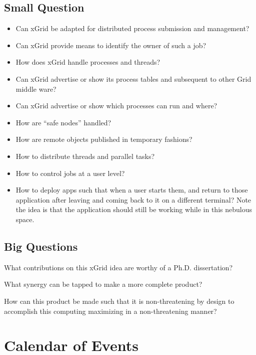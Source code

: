 \documentclass[11pt]{article}
\begin{document}
\newpage
\subsection {Small Question} 

\begin{itemize}
\item Can xGrid be adapted for distributed process submission and management?
\item Can xGrid provide means to identify the owner of such a job?
\item How does xGrid handle processes and threads?
\item Can xGrid advertise or show its process tables and subsequent to other Grid middle ware?
\item Can xGrid advertise or show which processes can run and where?
\item How are ``safe nodes'' handled?
\item How are remote objects published in temporary fashions?  
\item How to distribute threads and parallel tasks?
\item How to control jobs at a user level?
\item How to deploy apps such that when a user starts them, and return to those application after leaving and coming back to it on a different terminal?   Note the idea is that the application should still be working while in this nebulous space.
\end{itemize}

\subsection {Big Questions}
What contributions on this xGrid idea are worthy of a Ph.D. dissertation?

What synergy can be tapped to make a more complete product?

How can this product be made such that it is non-threatening by design to accomplish this computing maximizing in a non-threatening manner?  
\newpage
\section {Calendar of Events}
\end{document}

